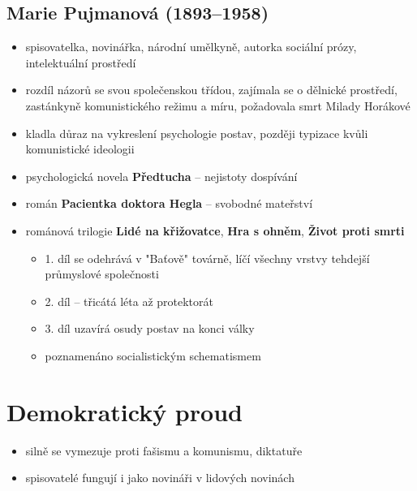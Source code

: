 \subsection{Marie Pujmanová (1893--1958)}
\begin{itemize}
\item spisovatelka, novinářka, národní umělkyně, autorka sociální prózy, intelektuální prostředí
\item rozdíl názorů se svou společenskou třídou, zajímala se o dělnické prostředí, zastánkyně komunistického režimu a míru, požadovala smrt Milady Horákové
\item kladla důraz na vykreslení psychologie postav, později typizace kvůli komunistické ideologii
\item psychologická novela \textbf{Předtucha} -- nejistoty dospívání
\item román \textbf{Pacientka doktora Hegla} -- svobodné mateřství
\item románová trilogie \textbf{Lidé na křižovatce}, \textbf{Hra s ohněm}, \textbf{Život proti smrti}
	\begin{itemize}
	\item 1. díl se odehrává v "Baťově" továrně, líčí všechny vrstvy tehdejší průmyslové společnosti
	\item 2. díl -- třicátá léta až protektorát
	\item 3. díl uzavírá osudy postav na konci války
	\item poznamenáno socialistickým schematismem
	\end{itemize}
\end{itemize}

\section{Demokratický proud}
\begin{itemize}
\item silně se vymezuje proti fašismu a komunismu, diktatuře
\item spisovatelé fungují i jako novináři v lidových novinách
\end{itemize}

